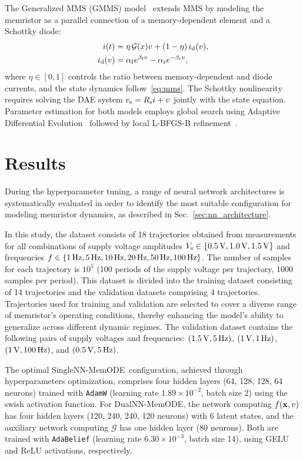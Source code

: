 \documentclass[a4,journal]{IEEEtran}
\newcommand{\G}{\mathcal{G}} %
\newcommand{\Gm}{\mathcal{G}} %
\newcommand{\ua}{v}
\newcommand{\Vs}{V_{\rm s}}
\newcommand{\vs}{v_{\rm s}}
\newcommand{\vm}{v}  %
\newcommand{\im}{i}  %
\newcommand{\Rs}{R_{\rm s}}
\newcommand{\Hz}{\,{\rm Hz}} %
\newcommand{\V}{\,{\rm V}} %
\newcommand{\MemODEOne}{SingleNN-MemODE}
\newcommand{\MemODETwo}{DualNN-MemODE}
\begin{document}
The Generalized MMS (GMMS) model~\cite{Molter2016, Ostrovskii2021} extends MMS by modeling the memristor as a parallel connection of a memory-dependent element and a Schottky diode:
\begin{align}
  \begin{split}
    \im(t)     & = \eta \, \Gm(x) v + (1-\eta) \, i_{\rm d}(v), \\
    i_{\rm d}(v) & = \alpha_{\rm f} e^{\beta_{\rm f} v} - \alpha_{\rm r} e^{-\beta_{\rm r} v},
  \end{split}
  \label{eq:gmms}
\end{align}
where \(\eta\in[0,1]\) controls the ratio between memory-dependent and diode currents, and the state dynamics follow~\eqref{eq:mms}. The Schottky nonlinearity requires solving the DAE system \(\vs = \Rs i + \vm\) jointly with the state equation. Parameter estimation for both models employs global search using Adaptive Differential Evolution~\cite{BlackBoxOptim} followed by local L-BFGS-B refinement~\cite{Zhu1997}.

\section{Results}
\label{sec:results}

\noindent During the hyperparameter tuning, a range of neural network architectures is systematically evaluated in order to identify the most suitable configuration for modeling memristor dynamics, as described in Sec.~\ref{sec:nn_architecture}.

In this study, the dataset consists of 18 trajectories obtained from measurements for all combinations of supply voltage amplitudes \(\Vs  \in \{0.5\V,1.0\V,1.5\V\}\) and frequencies \(f \in \{1\Hz,5\Hz,10\Hz,20\Hz,50\Hz,100\Hz\}\). The number of samples for each trajectory is \(10^5\) (100 periods of the supply voltage per trajectory, 1000 samples per period). 
This dataset is divided into the training dataset consisting of 14 trajectories and the validation datasets comprising 4 trajectories.
Trajectories used for training and validation are selected to cover a diverse range of memristor's operating conditions, thereby enhancing the model's ability to generalize across different dynamic regimes.
The validation dataset contains the following pairs of supply voltages and frequencies: \((1.5\V, 5\Hz)\), \((1\V, 1\Hz)\), \((1\V, 100\Hz)\), and \((0.5\V, 5\Hz)\).

The optimal \MemODEOne\ configuration, achieved through hyperparameters optimization,  comprises four hidden layers (64, 128, 128, 64 neurons) trained with \texttt{AdamW} (learning rate \(1.89 \times 10^{-2}\), batch size 2) using the swish activation function. For \MemODETwo, the network computing \(f(\xvec,\ua)\) has four hidden layers (120, 240, 240, 120 neurons) with 6 latent states, and the auxiliary network computing \(\G\) has one hidden layer (80 neurons). Both are trained with \texttt{AdaBelief} (learning rate \(6.30 \times 10^{-3}\), batch size 14), using GELU and ReLU activations, respectively.
\end{document}
